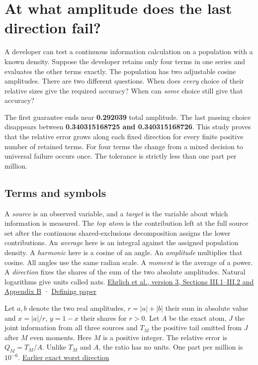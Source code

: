 \section{At what amplitude does the last direction fail?}\label{at-what-amplitude-does-the-last-direction-fail}

A developer can test a continuous information calculation on a population with a known density. Suppose the developer retains only four terms in one series and evaluates the other terms exactly. The population has two adjustable cosine amplitudes. There are two different questions. When does \emph{every} choice of their relative sizes give the required accuracy? When can \emph{some} choice still give that accuracy?

The first guarantee ends near \textbf{0.292039} total amplitude. The last passing choice disappears between \textbf{0.340315168725 and 0.340315168726}. This study proves that the relative error grows along each fixed direction for every finite positive number of retained terms. For four terms the change from a mixed decision to universal failure occurs once. The tolerance is strictly less than one part per million.

\subsection{Terms and symbols}\label{terms-and-symbols}

A \emph{source} is an observed variable, and a \emph{target} is the variable about which information is measured. The \emph{top atom} is the contribution left at the full source set after the continuous shared-exclusions decomposition assigns the lower contributions. An \emph{average} here is an integral against the assigned population density. A \emph{harmonic} here is a cosine of an angle. An \emph{amplitude} multiplies that cosine. All angles use the same radian scale. A \emph{moment} is the average of a power. A \emph{direction} fixes the shares of the sum of the two absolute amplitudes. Natural logarithms give units called nats. \href{https://arxiv.org/html/2311.06373v3}{Ehrlich et al., version 3, Sections III.1--III.2 and Appendix B} · \href{https://doi.org/10.1103/PhysRevE.110.014115}{Defining paper}

Let \(a,b\) denote the two real amplitudes, \(r=|a|+|b|\) their sum in absolute value and \(x=|a|/r\), \(y=1-x\) their shares for \(r>0\). Let \(A\) be the exact atom, \(J\) the joint information from all three sources and \(T_M\) the positive tail omitted from \(J\) after \(M\) even moments. Here \(M\) is a positive integer. The relative error is \(Q_M=T_M/A\). Unlike \(T_M\) and \(A\), the ratio has no units. One part per million is \(10^{-6}\). \href{https://github.com/sepahead/pid-rs/blob/ef705d1ed3410fd9fbbf4920cb4643f6a5140a2f/audit/research/angular-truncation-extremum/EXPOSITION.md}{Earlier exact worst direction}

